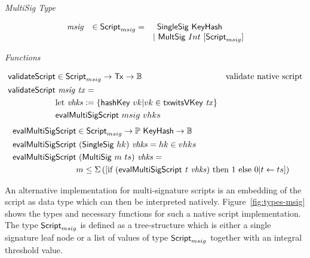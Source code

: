 \documentclass[11pt,a4paper,dvipsnames]{article}
\newcommand{\Bool}{\ensuremath{\mathbb{B}}}
\newcommand{\Tx}{\type{Tx}}
\newcommand{\Script}{\type{Script}}
\newcommand{\ScriptMSig}{\Script_{msig}}
\newcommand{\KeyHash}{\type{KeyHash}}
\theoremstyle{definition}
\newcommand{\leteq}{\ensuremath{\mathrel{\mathop:}=}}
\begin{document}
\begin{figure*}[hbt]
  \emph{MultiSig Type}

  \begin{equation*}
    \begin{array}{rll}
      \var{msig} & \in \ScriptMSig = & \,\,\,\type{SingleSig}~\KeyHash \\
       && \vert\,\,\type{MultSig}~Int~[\ScriptMSig]
    \end{array}
  \end{equation*}

  \emph{Functions}

  \begin{align*}
    \fun{validateScript} & \in\ScriptMSig\to\Tx\to\Bool & \text{validate native
                                                          script} \\
    \fun{validateScript} & ~\var{msig}~\var{tx}= \\
                         & \textrm{let}~\var{vhks}\leteq \{\fun{hashKey}~vk \vert
                           vk \in \fun{txwitsVKey}~\var{tx}\} \\
                         & \fun{evalMultiSigScript}~msig~vhks\\
  \end{align*}
  \begin{align*}
    \fun{evalMultiSigScript} & \in\ScriptMSig\to\powerset\KeyHash\to\Bool & \\
    \fun{evalMultiSigScript} & ~(\type{SingleSig}~hk)~\var{vhks} =  hk \in vhks \\
    \fun{evalMultiSigScript} & ~(\type{MultiSig}~m~ts)~\var{vhks} = \\
                             & m \leq \Sigma
                               \left(
                               [\textrm{if}~(\fun{evalMultiSigScript}~\var{t}~\var{vhks})~
                               \textrm{then}~1~\textrm{else}~0\vert t \leftarrow ts]
                               \right)
  \end{align*}

  \caption{Implementation based on Native Scripts}
  \label{fig:types-msig}
\end{figure*}

An alternative implementation for multi-signature scripts is an embedding of the
script as data type which can then be interpreted
natively. Figure~\ref{fig:types-msig} shows the types and necessary functions
for such a native script implementation. The type $\ScriptMSig$ is defined as a
tree-structure which is either a single signature leaf node or a list of
values of type $\ScriptMSig$ together with an integral threshold value.
\end{document}
